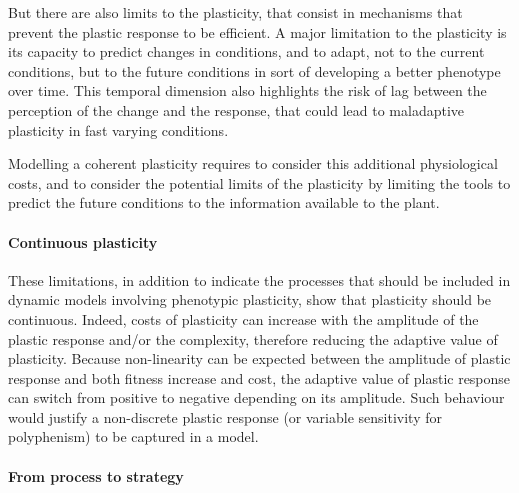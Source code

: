 But there are also limits to the plasticity, that consist in mechanisms that prevent the plastic response to be efficient. A major limitation to the plasticity is its capacity to predict changes in conditions, and to adapt, not to the current conditions, but to the future conditions in sort of developing a better phenotype over time. This temporal dimension also highlights the risk of lag between the perception of the change and the response, that could lead to maladaptive plasticity in fast varying conditions.

Modelling a coherent plasticity requires to consider this additional physiological costs, and to consider the potential limits of the plasticity by limiting the tools to predict the future conditions to the information available to the plant.



\paragraph{Continuous plasticity}
These limitations, in addition to indicate the processes that should be included in dynamic models involving phenotypic plasticity, show that plasticity should be continuous. Indeed, costs of plasticity can increase with the amplitude of the plastic response and/or the complexity, therefore reducing the adaptive value of plasticity. Because non-linearity can be expected between the amplitude of plastic response and both fitness increase and cost, the adaptive value of plastic response can switch from positive to negative depending on its amplitude. Such behaviour would justify a non-discrete plastic response (or variable sensitivity for polyphenism) to be captured in a model.
%
%


%
%


\paragraph{From process to strategy}

